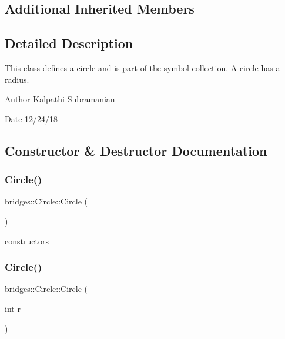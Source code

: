\subsection*{Additional Inherited Members}


\subsection{Detailed Description}
This class defines a circle and is part of the symbol collection. A circle has a radius. 

\begin{DoxyAuthor}{Author}
Kalpathi Subramanian 
\end{DoxyAuthor}
\begin{DoxyDate}{Date}
12/24/18 
\end{DoxyDate}


\subsection{Constructor \& Destructor Documentation}
\mbox{\label{classbridges_1_1_circle_a97471b91ab283daf66e257ba982bf404}} 
\subsubsection{\texorpdfstring{Circle()}{Circle()}\hspace{0.1cm}{\footnotesize\ttfamily [1/3]}}
{\footnotesize\ttfamily bridges\+::\+Circle\+::\+Circle (\begin{DoxyParamCaption}{ }\end{DoxyParamCaption})\hspace{0.3cm}{\ttfamily [inline]}}

constructors \mbox{\label{classbridges_1_1_circle_a970e38244503f91ca4003acb183763fb}} 
\subsubsection{\texorpdfstring{Circle()}{Circle()}\hspace{0.1cm}{\footnotesize\ttfamily [2/3]}}
{\footnotesize\ttfamily bridges\+::\+Circle\+::\+Circle (\begin{DoxyParamCaption}\item[{int}]{r }\end{DoxyParamCaption})\hspace{0.3cm}{\ttfamily [inline]}}

